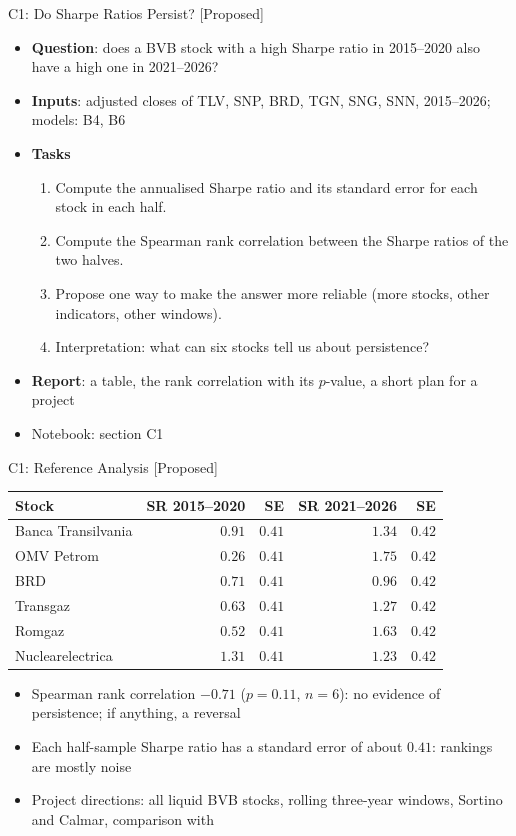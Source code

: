 \begin{frame}{C1: Do Sharpe Ratios Persist? [Proposed]}
\itemsize{\footnotesize}
\begin{itemize}
\item \textbf{Question}: does a BVB stock with a high Sharpe ratio in 2015--2020 also have a high one in 2021--2026?
\item \textbf{Inputs}: adjusted closes of TLV, SNP, BRD, TGN, SNG, SNN, 2015--2026; models: B4, B6
\item \textbf{Tasks}
\begin{enumerate}
    \item Compute the annualised Sharpe ratio and its standard error for each stock in each half.
    \item Compute the Spearman rank correlation between the Sharpe ratios of the two halves.
    \item Propose one way to make the answer more reliable (more stocks, other indicators, other windows).
    \item Interpretation: what can six stocks tell us about persistence?
\end{enumerate}
\item \textbf{Report}: a table, the rank correlation with its $p$-value, a short plan for a project
\item Notebook: section C1
\end{itemize}
\end{frame}

\ifsolutions
\begin{frame}{C1: Reference Analysis [Proposed]}
\itemsize{\footnotesize}
\begin{center}
\footnotesize
\begin{tabular}{lrrrr}
\toprule
Stock & SR 2015--2020 & SE & SR 2021--2026 & SE \\
\midrule
Banca Transilvania & $0.91$ & $0.41$ & $1.34$ & $0.42$ \\
OMV Petrom & $0.26$ & $0.41$ & $1.75$ & $0.42$ \\
BRD & $0.71$ & $0.41$ & $0.96$ & $0.42$ \\
Transgaz & $0.63$ & $0.41$ & $1.27$ & $0.42$ \\
Romgaz & $0.52$ & $0.41$ & $1.63$ & $0.42$ \\
Nuclearelectrica & $1.31$ & $0.41$ & $1.23$ & $0.42$ \\
\bottomrule
\end{tabular}
\end{center}
\begin{itemize}
    \item Spearman rank correlation $-0.71$ ($p = 0.11$, $n = 6$): no evidence of persistence; if anything, a reversal
    \item Each half-sample Sharpe ratio has a standard error of about $0.41$: rankings are mostly noise
    \item Project directions: all liquid BVB stocks, rolling three-year windows, Sortino and Calmar, comparison with 
\end{itemize}
\end{frame}
\fi

